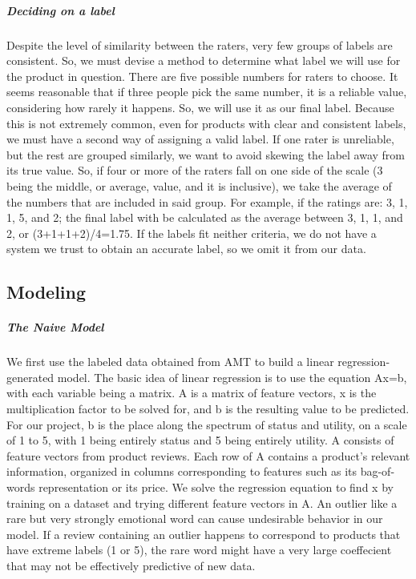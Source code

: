 \documentclass[dvips,12pt]{article}
\begin{document}
\subparagraph{Deciding on a label}
Despite the level of similarity between the raters, very few groups of labels are consistent. So, we must devise a method to determine what label we will use for the product in question. There are five possible numbers for raters to choose. It seems reasonable that if three people pick the same number, it is a reliable value, considering how rarely it happens. So, we will use it as our final label. Because this is not extremely common, even for products with clear and consistent labels, we must have a second way of assigning a valid label. If one rater is unreliable, but the rest are grouped similarly, we want to avoid skewing the label away from its true value. So, if four or more of the raters fall on one side of the scale (3 being the middle, or average, value, and it is inclusive), we take the average of the numbers that are included in said group. For example, if the ratings are: 3, 1, 1, 5, and 2; the final label with be calculated as the average between 3, 1, 1, and 2, or (3+1+1+2)/4=1.75. If the labels fit neither criteria, we do not have a system we trust to obtain an accurate label, so we omit it from our data.

\subsection{Modeling}

\subparagraph{The Naive Model}

We first use the labeled data obtained from AMT to build a linear regression-generated model. The basic idea of linear regression is to use the equation Ax=b, with each variable being a matrix. A is a matrix of feature vectors, x is the multiplication factor to be solved for, and b is the resulting value to be predicted. For our project, b is the place along the spectrum of status and utility, on a scale of 1 to 5, with 1 being entirely status and 5 being entirely utility. A consists of feature vectors from product reviews. Each row of A contains a product’s relevant information, organized in columns corresponding to features such as its bag-of-words representation or its price. We solve the regression equation to find x by training on a dataset and trying different feature vectors in A.
An outlier like a rare but very strongly emotional word can cause undesirable behavior in our model. If a review containing an outlier happens to correspond to products that have extreme labels (1 or 5), the rare word might have a very large coeffecient that may not be effectively predictive of new data.
\end{document}
